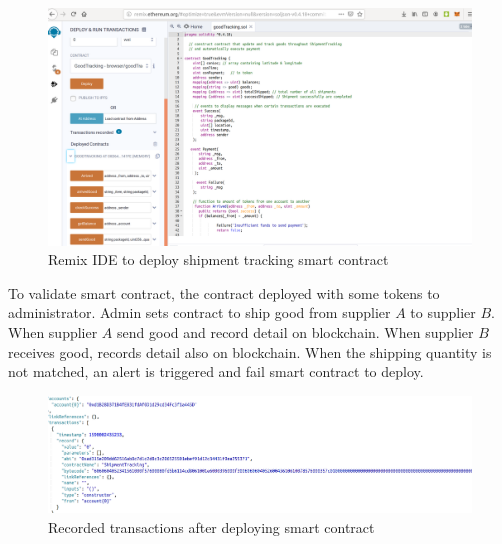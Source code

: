 \begin{center}
	
	\begin{figure}[htb!]
		
		\begin{minipage}{0.55\linewidth}
			\centering
			\includegraphics[width=1.55\textwidth]{images/chap03_remix.png}
		\end{minipage}
		\caption{Remix IDE to deploy shipment tracking smart contract}
		
	\end{figure}
	
\end{center}

To validate smart contract, the contract deployed with some tokens to administrator. Admin sets contract to ship good from supplier $A$ to supplier $B$. When supplier $A$ send good and record detail on blockchain. When supplier $B$ receives good, records detail also on blockchain. When the shipping quantity is not matched, an alert is triggered and fail smart contract to deploy.

\begin{center}
	
	\begin{figure}[htb!]
		
		\begin{minipage}{0.55\linewidth}
			\centering
			\includegraphics[width=1.55\textwidth]{images/chap03_ABI.png}
		\end{minipage}
		\caption{Recorded transactions after deploying smart contract}
		
	\end{figure}
	
\end{center}



